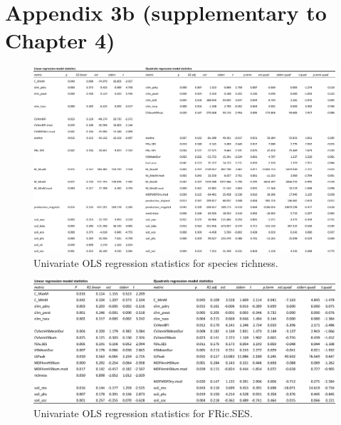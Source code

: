\chapter[Appendix 3b]{Appendix 3b (supplementary to Chapter 4)}

\begin{landscape}
\begin{figure}[h!]
\begin{center}
\includegraphics[width=20cm]{regression stats_sprichChao1.pdf} %
\caption[Univariate OLS regression statistics for species richness.]{\small{Univariate OLS regression statistics for species richness.}} %
\label{fig:Ch4sup2_F1} %
\end{center}
\end{figure}   
\end{landscape}
\clearpage

\begin{landscape}
\begin{figure}[h!]
\begin{center}
\includegraphics[width=20cm]{S2b.pdf} %
\caption[Univariate OLS regression statistics for FRic.SES.]{\small{Univariate OLS regression statistics for FRic.SES.}} %
\label{fig:Ch4sup2_F1} %
\end{center}
\end{figure}   
\end{landscape}
\clearpage

